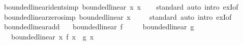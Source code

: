 \begin{isabellebody}
\isadelimproof
\isanewline
%
\endisadelimproof
\isanewline
{}\isamarkupfalse%
\isanewline
\isanewline
{}\isamarkupfalse%
\ bounded{\isacharunderscore}{\kern0pt}linear{\isacharunderscore}{\kern0pt}ident{\isacharbrackleft}{\kern0pt}simp{\isacharbrackright}{\kern0pt}{\isacharcolon}{\kern0pt}\ {\isachardoublequoteopen}bounded{\isacharunderscore}{\kern0pt}linear\ {\isacharparenleft}{\kern0pt}{\isasymlambda}x{\isachardot}{\kern0pt}\ x{\isacharparenright}{\kern0pt}{\isachardoublequoteclose}\isanewline
%
\isadelimproof
\ \ %
\endisadelimproof
%
\isatagproof
{}\isamarkupfalse%
\ standard\ {\isacharparenleft}{\kern0pt}auto\ intro{\isacharbang}{\kern0pt}{\isacharcolon}{\kern0pt}\ exI{\isacharbrackleft}{\kern0pt}of\ {\isacharunderscore}{\kern0pt}\ {}{\isacharbrackright}{\kern0pt}{\isacharparenright}{\kern0pt}%
\endisatagproof
{\isafoldproof}%
%
\isadelimproof
\isanewline
%
\endisadelimproof
\isanewline
{}\isamarkupfalse%
\ bounded{\isacharunderscore}{\kern0pt}linear{\isacharunderscore}{\kern0pt}zero{\isacharbrackleft}{\kern0pt}simp{\isacharbrackright}{\kern0pt}{\isacharcolon}{\kern0pt}\ {\isachardoublequoteopen}bounded{\isacharunderscore}{\kern0pt}linear\ {\isacharparenleft}{\kern0pt}{\isasymlambda}x{\isachardot}{\kern0pt}\ {}{\isacharparenright}{\kern0pt}{\isachardoublequoteclose}\isanewline
%
\isadelimproof
\ \ %
\endisadelimproof
%
\isatagproof
{}\isamarkupfalse%
\ standard\ {\isacharparenleft}{\kern0pt}auto\ intro{\isacharbang}{\kern0pt}{\isacharcolon}{\kern0pt}\ exI{\isacharbrackleft}{\kern0pt}of\ {\isacharunderscore}{\kern0pt}\ {}{\isacharbrackright}{\kern0pt}{\isacharparenright}{\kern0pt}%
\endisatagproof
{\isafoldproof}%
%
\isadelimproof
\isanewline
%
\endisadelimproof
\isanewline
{}\isamarkupfalse%
\ bounded{\isacharunderscore}{\kern0pt}linear{\isacharunderscore}{\kern0pt}add{\isacharcolon}{\kern0pt}\isanewline
\ \ \ {\isachardoublequoteopen}bounded{\isacharunderscore}{\kern0pt}linear\ f{\isachardoublequoteclose}\isanewline
\ \ \ \ \ {\isachardoublequoteopen}bounded{\isacharunderscore}{\kern0pt}linear\ g{\isachardoublequoteclose}\isanewline
\ \ \ {\isachardoublequoteopen}bounded{\isacharunderscore}{\kern0pt}linear\ {\isacharparenleft}{\kern0pt}{\isasymlambda}x{\isachardot}{\kern0pt}\ f\ x\ {\isacharplus}{\kern0pt}\ g\ x{\isacharparenright}{\kern0pt}{\isachardoublequoteclose}\isanewline
%
\isadelimproof
%
\endisadelimproof
%
\isatagproof
{}\isamarkupfalse%
\ {\isacharminus}{\kern0pt}\isanewline

\end{isabellebody}
